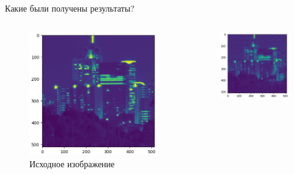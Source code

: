 \documentclass{beamer}
\begin{document}
\begin{frame}{Какие были получены результаты?}
    
    \begin{columns}
        \begin{column}{0.245\textwidth}
            \begin{figure}
                \centering
                    \includegraphics[width=\linewidth]{init.PNG}
                    \caption{Исходное изображение}\label{fig:awesome_image1}
            \end{figure}
        \end{column}
        \begin{column}{0.245\textwidth}
            \begin{figure}
                \centering
                    \includegraphics[width=\linewidth]{4.PNG}

\end{figure}
\end{column}
\end{columns}
\end{frame}
\end{document}
